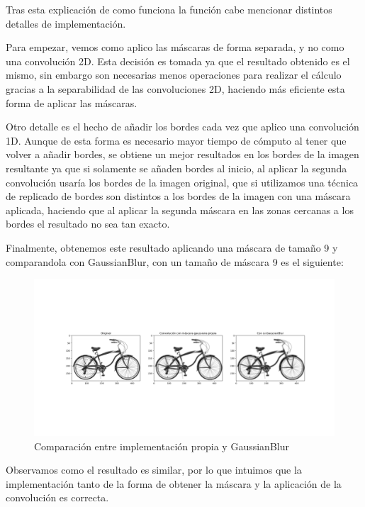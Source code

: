 \documentclass[12pt, spanish]{article}
\begin{document}
Tras esta explicación de como funciona la función cabe mencionar distintos detalles de implementación.

Para empezar, vemos como aplico las máscaras de forma separada, y no como una convolución 2D. Esta decisión es tomada ya que el resultado obtenido es el mismo, sin embargo son necesarias menos operaciones para realizar el cálculo gracias a la separabilidad de las convoluciones 2D, haciendo más eficiente esta forma de aplicar las máscaras\cite{separabilidad_2D}.

Otro detalle es el hecho de añadir los bordes cada vez que aplico una convolución 1D. Aunque de esta forma es necesario mayor tiempo de cómputo al tener que volver a añadir bordes, se obtiene un mejor resultados en los bordes de la imagen resultante ya que si solamente se añaden bordes al inicio, al aplicar la segunda convolución usaría los bordes de la imagen original, que si utilizamos una técnica de replicado de bordes son distintos a los bordes de la imagen con una máscara aplicada, haciendo que al aplicar la segunda máscara en las zonas cercanas a los bordes el resultado no sea tan exacto.


Finalmente, obtenemos este resultado aplicando una máscara de tamaño 9 y comparandola con GaussianBlur, con un tamaño de máscara 9 es el siguiente:


\begin{figure}[H]
  \centering
      \includegraphics[width=\textwidth]{ejercicio1-b.png}
 		 \caption{Comparación entre implementación propia y GaussianBlur}
  		\label{fig:ej1b}

\end{figure}

Observamos como el resultado es similar, por lo que intuimos que la implementación tanto de la forma de obtener la máscara y la aplicación de la convolución es correcta.
\end{document}
